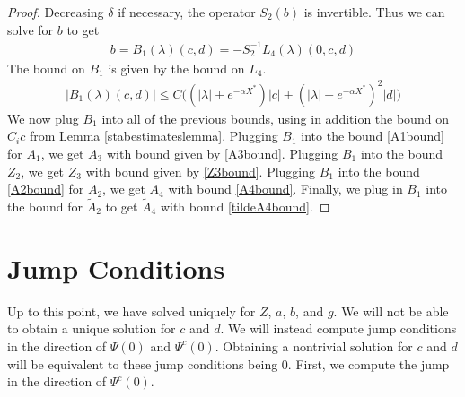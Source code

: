 \documentclass[thesis.tex]{subfiles}
\begin{document}
\begin{lemma}
\begin{proof}
Decreasing $\delta$ if necessary, the operator $S_2(b)$ is invertible. Thus we can solve for $b$ to get
\begin{align}
b = B_1(\lambda)(c,d) 
= -S_2^{-1} L_4(\lambda)(0, c, d)
\end{align}
The bound on $B_1$ is given by the bound on $L_4$.
\begin{align*}
|B_1(\lambda)(c, d)| \leq C\Big( (|\lambda| + e^{-\alpha X^*})|c| + (|\lambda| + e^{-\alpha X^*})^2 |d| \Big) 
\end{align*}
We now plug $B_1$ into all of the previous bounds, using in addition the bound on $C_i c$ from Lemma \ref{stabestimateslemma}. Plugging $B_1$ into the bound \eqref{A1bound} for $A_1$, we get $A_3$ with bound given by \cref{A3bound}. Plugging $B_1$ into the bound $Z_2$, we get $Z_3$ with bound given by \cref{Z3bound}. Plugging $B_1$ into the bound \eqref{A2bound} for $A_2$, we get $A_4$ with bound \cref{A4bound}. Finally, we plug in $B_1$ into the bound for $\tilde{A}_2$ to get $\tilde{A}_4$ with bound \cref{tildeA4bound}.
\end{proof}
\end{lemma}

\section{Jump Conditions}

Up to this point, we have solved uniquely for $Z$, $a$, $b$, and $g$. We will not be able to obtain a unique solution for $c$ and $d$. We will instead compute jump conditions in the direction of $\Psi(0)$ and $\Psi^c(0)$. Obtaining a nontrivial solution for $c$ and $d$ will be equivalent to these jump conditions being 0. First, we compute the jump in the direction of $\Psi^c(0)$. 
\end{document}
